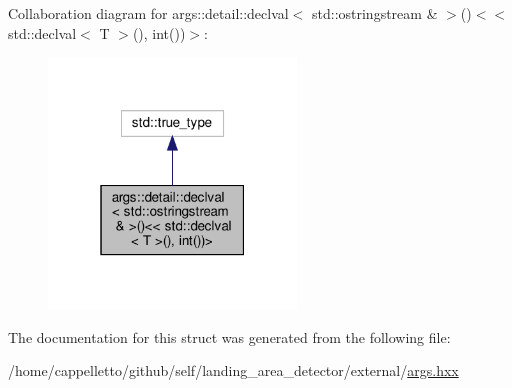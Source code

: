 Collaboration diagram for args\+:\+:detail\+:\+:declval$<$ std\+:\+:ostringstream \& $>$()$<$$<$ std\+:\+:declval$<$ T $>$(), int())$>$\+:\nopagebreak
\begin{figure}[H]
\begin{center}
\leavevmode
\includegraphics[width=187pt]{structargs_1_1detail_1_1_is_convertable_to_string_3_01_t_00_01decltype_07std_1_1declval_3_01std_007c5f510ea472af626d078fe6442af9}
\end{center}
\end{figure}


The documentation for this struct was generated from the following file\+:\begin{DoxyCompactItemize}
\item 
/home/cappelletto/github/self/landing\+\_\+area\+\_\+detector/external/\hyperlink{args_8hxx}{args.\+hxx}\end{DoxyCompactItemize}
